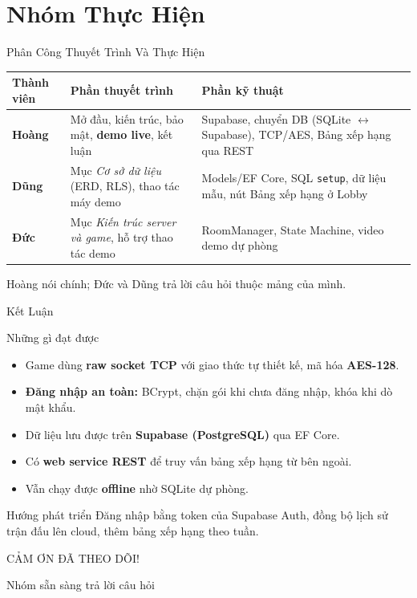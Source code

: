 \section{Nhóm Thực Hiện}

\begin{frame}{Phân Công Thuyết Trình Và Thực Hiện}
  \small
  \renewcommand{\arraystretch}{1.3}
  \begin{tabularx}{\textwidth}{@{}>{\raggedright\arraybackslash}p{2.4cm} Y Y@{}}
    \toprule
    \textbf{Thành viên} & \textbf{Phần thuyết trình} & \textbf{Phần kỹ thuật} \\
    \midrule
    \textbf{Hoàng} 
      & Mở đầu, kiến trúc, bảo mật, \textbf{demo live}, kết luận
      & Supabase, chuyển DB (SQLite $\leftrightarrow$ Supabase), TCP/AES, Bảng xếp hạng qua REST \\
    \textbf{Dũng}
      & Mục \textit{Cơ sở dữ liệu} (ERD, RLS), thao tác máy demo
      & Models/EF Core, SQL \texttt{setup}, dữ liệu mẫu, nút Bảng xếp hạng ở Lobby \\
    \textbf{Đức}
      & Mục \textit{Kiến trúc server và game}, hỗ trợ thao tác demo
      & RoomManager, State Machine, video demo dự phòng \\
    \bottomrule
  \end{tabularx}
  \vspace{0.25cm}

  \footnotesize Hoàng nói chính; Đức và Dũng trả lời câu hỏi thuộc mảng của mình.
\end{frame}

\begin{frame}{Kết Luận}
  \begin{block}{Những gì đạt được}
    \begin{itemize}
      \item Game dùng \textbf{raw socket TCP} với giao thức tự thiết kế, mã hóa \textbf{AES-128}.
      \item \textbf{Đăng nhập an toàn:} BCrypt, chặn gói khi chưa đăng nhập, khóa khi dò mật khẩu.
      \item Dữ liệu lưu được trên \textbf{Supabase (PostgreSQL)} qua EF Core.
      \item Có \textbf{web service REST} để truy vấn bảng xếp hạng từ bên ngoài.
      \item Vẫn chạy được \textbf{offline} nhờ SQLite dự phòng.
    \end{itemize}
  \end{block}
  \begin{exampleblock}{Hướng phát triển}
    Đăng nhập bằng token của Supabase Auth, đồng bộ lịch sử trận đấu lên cloud, thêm bảng xếp hạng theo tuần.
  \end{exampleblock}
\end{frame}

\begin{frame}
  \centering
  \vspace{1.5cm}
  {\bungee\color{inkblue}\fontsize{20}{24}\selectfont CẢM ƠN ĐÃ THEO DÕI!}\par
  \vspace{0.3cm}
  {\bevnsemi\color{brandblue}\small Nhóm sẵn sàng trả lời câu hỏi}
\end{frame}
